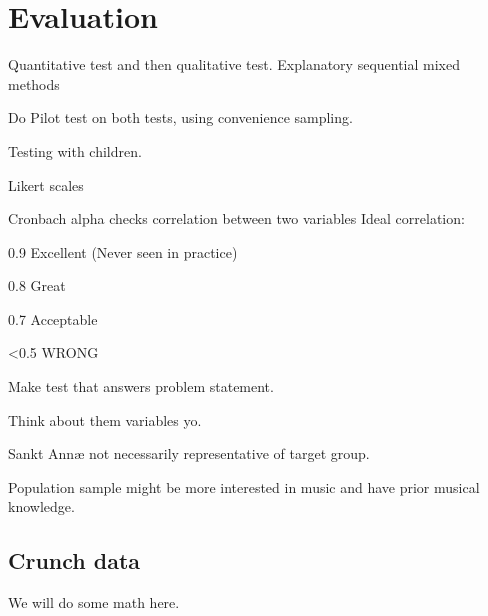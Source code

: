 \section{Evaluation}
Quantitative test and then qualitative test.
Explanatory sequential mixed methods\cite[p.~21]{bjoernerBog}

Do Pilot test on both tests, using convenience sampling.

Testing with children\cite[p.~207]{bjoernerBog}.

Likert scales

Cronbach alpha checks correlation between two variables
Ideal correlation:

0.9 Excellent (Never seen in practice)

0.8 Great

0.7 Acceptable

<0.5 WRONG

Make test that answers problem statement.

Think about them variables yo.

Sankt Annæ not necessarily representative of target group.

Population sample might be more interested in music and have prior musical knowledge.

\subsection{Crunch data}
	We will do some math here.\cite{nyBog}
